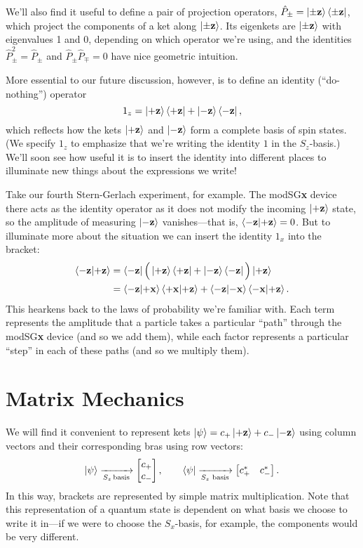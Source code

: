 \documentclass[../p116main.tex]{subfiles}
\begin{document}
We'll also find it useful to define a pair of projection operators, $\hat P_\pm = \left| \pm \mathbf{z} \right> \left< \pm \mathbf{z} \right|$, which project the components of a ket along $\left| \pm \mathbf{z} \right>$.
Its eigenkets are $\left| \pm \mathbf{z} \right>$ with eigenvalues 1 and 0, depending on which operator we're using, and the identities $\hat P_\pm^2 = \hat P_\pm$ and $\hat P_\pm \hat P_\mp = 0$ have nice geometric intuition.

More essential to our future discussion, however, is to define an identity (``do-nothing'') operator
\[ 1_z = \left| +\mathbf{z} \right> \left< +\mathbf{z} \right| + \left| -\mathbf{z} \right> \left< -\mathbf{z} \right|, \]
which reflects how the kets $\left| +\mathbf{z} \right>$ and $\left| -\mathbf{z} \right>$ form a complete basis of spin states.
(We specify $1_z$ to emphasize that we're writing the identity $1$ in the $S_z$-basis.)
We'll soon see how useful it is to insert the identity into different places to illuminate new things about the expressions we write!

Take our fourth Stern-Gerlach experiment, for example.
The modSG\textbf{x} device there acts as the identity operator as it does not modify the incoming $\left| +\mathbf{z} \right>$ state, so the amplitude of measuring $\left| -\mathbf{z} \right>$ vanishes---that is, $\left< -\mathbf{z} \middle| +\mathbf{z} \right> = 0$.
But to illuminate more about the situation we can insert the identity $1_x$ into the bracket:
\begin{align*}
    \left< -\mathbf{z} \middle| +\mathbf{z} \right> &= \left< -\mathbf{z} \right| \Big( \left| +\mathbf{z} \right>\left< +\mathbf{z} \right| + \left| -\mathbf{z} \right>\left< -\mathbf{z} \right| \Big) \left| +\mathbf{z} \right> \\
    &= \left< -\mathbf{z} \middle| +\mathbf{x} \right> \left< +\mathbf{x} \middle| +\mathbf{z} \right> + \left< -\mathbf{z} \middle| -\mathbf{x} \right> \left< -\mathbf{x} \middle| +\mathbf{z} \right>.
\end{align*}
This hearkens back to the laws of probability we're familiar with.
Each term represents the amplitude that a particle takes a particular ``path'' through the modSG\textbf{x} device (and so we add them), while each factor represents a particular ``step'' in each of these paths (and so we multiply them).

\section{Matrix Mechanics}
We will find it convenient to represent kets $\left| \psi \right> = c_+ \left| +\mathbf{z} \right> + c_- \left| -\mathbf{z} \right>$ using column vectors and their corresponding bras using row vectors:
\[ \left| \psi \right> \xrightarrow[{S_z \,\textrm{basis}}]{} \begin{bmatrix} c_+ \\ c_- \end{bmatrix}, \qquad \left< \psi \right| \xrightarrow[{S_z \textrm{ basis}}]{} \begin{bmatrix} c_+^* & c_-^* \end{bmatrix}. \]
In this way, brackets are represented by simple matrix multiplication.
Note that this representation of a quantum state is dependent on what basis we choose to write it in---if we were to choose the $S_x$-basis, for example, the components would be very different.
\end{document}
